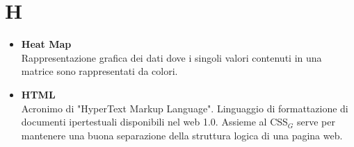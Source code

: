 \chapter{H} \label{H}
\begin{itemize}
	\item \textbf{Heat Map} \\
	 Rappresentazione grafica dei dati dove i singoli valori contenuti in una matrice sono rappresentati da colori.

	 \item \textbf{HTML} \\
	 Acronimo di "HyperText Markup Language".
	 Linguaggio di formattazione di documenti ipertestuali disponibili nel web 1.0.
	 Assieme al CSS$_G$ serve per mantenere una buona separazione della struttura logica di una pagina web.
\end{itemize}
